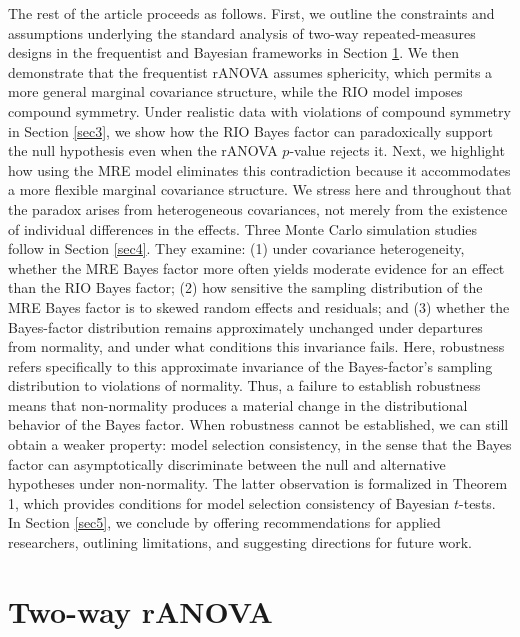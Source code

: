 \documentclass[preprint,12pt,authoryear]{elsarticle}
\begin{document}
The rest of the article proceeds as follows. First, we outline the constraints and assumptions underlying the standard analysis of two-way repeated-measures designs in the frequentist and Bayesian frameworks in Section \ref{sec2}. We then demonstrate that the frequentist rANOVA assumes sphericity, which permits a more general marginal covariance structure, while the RIO model imposes compound symmetry. Under realistic data with violations of compound symmetry in Section \ref{sec3}, we show how the RIO Bayes factor can paradoxically support the null hypothesis even when the rANOVA $p$-value rejects it. Next, we highlight how using the MRE model eliminates this contradiction because it accommodates a more flexible marginal covariance structure. We stress here and throughout that the paradox arises from heterogeneous covariances, not merely from the existence of individual differences in the effects. Three Monte Carlo simulation studies follow in Section \ref{sec4}. They examine: (1) under covariance heterogeneity, whether the MRE Bayes factor more often yields moderate evidence for an effect than the RIO Bayes factor; (2) how sensitive the sampling distribution of the MRE Bayes factor is to skewed random effects and residuals; and (3) whether the Bayes-factor distribution remains approximately unchanged under departures from normality, and under what conditions this invariance fails. Here, robustness refers specifically to this approximate invariance of the Bayes-factor's sampling distribution to violations of normality. Thus, a failure to establish robustness means that non-normality produces a material change in the distributional behavior of the Bayes factor. When robustness cannot be established, we can still obtain a weaker property: model selection consistency, in the sense that the Bayes factor can asymptotically discriminate between the null and alternative hypotheses under non-normality. The latter observation is formalized in Theorem 1, which provides conditions for model selection consistency of Bayesian $t$-tests. In Section \ref{sec5}, we conclude by offering recommendations for applied researchers, outlining limitations, and suggesting directions for future work.


\section{Two-way rANOVA}
\label{sec2}
\end{document}
